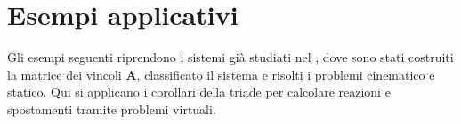\section{Esempi applicativi}
\label{sec:esempi_PLV}

Gli esempi seguenti riprendono i sistemi già studiati
nel , dove sono stati
costruiti la matrice dei vincoli $\bm{A}$, classificato
il sistema e risolti i problemi cinematico e statico.
Qui si applicano i corollari della triade per calcolare
reazioni e spostamenti tramite problemi virtuali.


